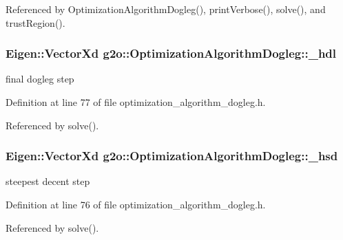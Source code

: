 Referenced by Optimization\+Algorithm\+Dogleg(), print\+Verbose(), solve(), and trust\+Region().

\subsubsection[{\texorpdfstring{\+\_\+hdl}{_hdl}}]{\setlength{\rightskip}{0pt plus 5cm}Eigen\+::\+Vector\+Xd g2o\+::\+Optimization\+Algorithm\+Dogleg\+::\+\_\+hdl\hspace{0.3cm}{\ttfamily [protected]}}\hypertarget{classg2o_1_1OptimizationAlgorithmDogleg_aaf433c824153a7bd76b27690eb53113b}{}\label{classg2o_1_1OptimizationAlgorithmDogleg_aaf433c824153a7bd76b27690eb53113b}


final dogleg step 



Definition at line 77 of file optimization\+\_\+algorithm\+\_\+dogleg.\+h.



Referenced by solve().

\subsubsection[{\texorpdfstring{\+\_\+hsd}{_hsd}}]{\setlength{\rightskip}{0pt plus 5cm}Eigen\+::\+Vector\+Xd g2o\+::\+Optimization\+Algorithm\+Dogleg\+::\+\_\+hsd\hspace{0.3cm}{\ttfamily [protected]}}\hypertarget{classg2o_1_1OptimizationAlgorithmDogleg_a8f4ee408fbf3999063d094cf61e852b7}{}\label{classg2o_1_1OptimizationAlgorithmDogleg_a8f4ee408fbf3999063d094cf61e852b7}


steepest decent step 



Definition at line 76 of file optimization\+\_\+algorithm\+\_\+dogleg.\+h.



Referenced by solve().


